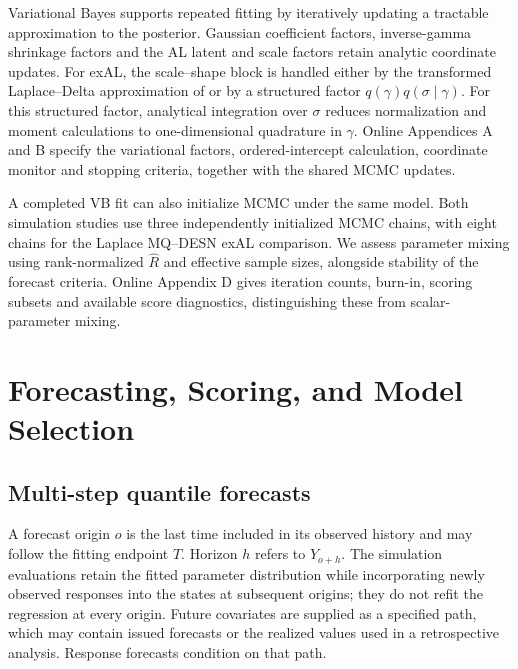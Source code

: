 \documentclass[12pt,letterpaper]{article}
\numberwithin{equation}{section}
\begin{document}
Variational Bayes supports repeated fitting by iteratively updating a
tractable approximation to the posterior. Gaussian coefficient factors,
inverse-gamma shrinkage factors and the AL latent and scale factors retain
analytic coordinate updates. For exAL, the scale--shape block is handled
either by the transformed Laplace--Delta approximation of
\citet{wang2013nonconjugatevb} or by a structured factor
\(q(\gamma)q(\sigma\mid\gamma)\). For this structured factor, analytical
integration over \(\sigma\) reduces normalization and moment calculations
to one-dimensional quadrature in \(\gamma\). Online Appendices A and B
specify the variational factors, ordered-intercept calculation, coordinate
monitor and stopping criteria, together with the shared MCMC updates.

A completed VB fit can also initialize MCMC under the same model. Both simulation
studies use three independently initialized MCMC chains, with eight chains
for the Laplace MQ--DESN exAL comparison. We assess parameter mixing using rank-normalized
\(\widehat R\) and effective sample sizes, alongside stability of the
forecast criteria. Online Appendix D gives iteration counts, burn-in,
scoring subsets and available score diagnostics, distinguishing these from
scalar-parameter mixing.

\section{Forecasting, Scoring, and Model Selection}
\label{sec:forecast}

\subsection{Multi-step quantile forecasts}

A forecast origin \(o\) is the last time included in its observed history
and may follow the fitting endpoint \(T\). Horizon \(h\) refers to
\(Y_{o+h}\). The simulation evaluations retain the fitted parameter
distribution while incorporating newly observed responses into the states
at subsequent origins; they do not refit the regression at every origin.
Future covariates are supplied as a specified path, which may contain issued
forecasts or the realized values used in a retrospective analysis. Response
forecasts condition on that path.
\end{document}

